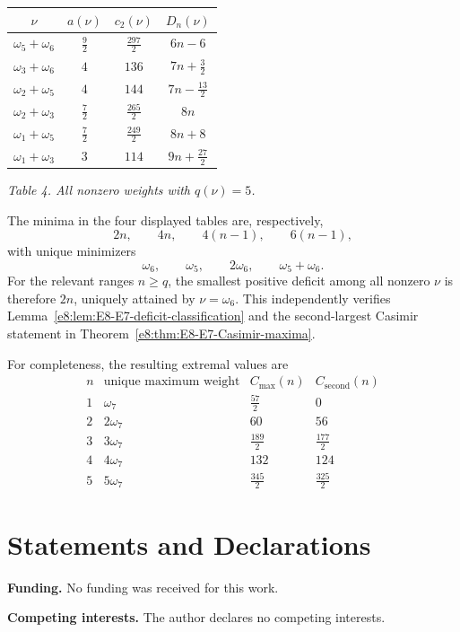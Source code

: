 \documentclass[11pt,reqno]{amsart}
\renewcommand{\arraystretch}{1.32}
\theoremstyle{definition}
\theoremstyle{remark}
\begin{document}
\begin{center}
\renewcommand{\arraystretch}{1.18}
\begin{tabular}{c|c|c|c}
$\nu$ & $a(\nu)$ & $c_2(\nu)$ & $D_n(\nu)$\\
\hline
$\omega_5+\omega_6$ & $\frac92$ & $\frac{297}{2}$
  & $6n-6$\\
$\omega_3+\omega_6$ & $4$ & $136$ & $7n+\frac32$\\
$\omega_2+\omega_5$ & $4$ & $144$ & $7n-\frac{13}{2}$\\
$\omega_2+\omega_3$ & $\frac72$ & $\frac{265}{2}$
  & $8n$\\
$\omega_1+\omega_5$ & $\frac72$ & $\frac{249}{2}$
  & $8n+8$\\
$\omega_1+\omega_3$ & $3$ & $114$ & $9n+\frac{27}{2}$
\end{tabular}
\par\smallskip
\textit{Table 4. All nonzero weights with $q(\nu)=5$.}
\end{center}

The minima in the four displayed tables are, respectively,
\begin{equation*}
 2n,\qquad 4n,\qquad 4(n-1),\qquad 6(n-1),
\end{equation*}
with unique minimizers
\begin{equation*}
 \omega_6,
 \qquad
 \omega_5,
 \qquad
 2\omega_6,
 \qquad
 \omega_5+\omega_6.
\end{equation*}
For the relevant ranges $n\ge q$, the smallest positive deficit among all
nonzero $\nu$ is therefore $2n$, uniquely attained by $\nu=\omega_6$.
This independently verifies Lemma~\ref{e8:lem:E8-E7-deficit-classification}
and the second-largest Casimir statement in
Theorem~\ref{e8:thm:E8-E7-Casimir-maxima}.

For completeness, the resulting extremal values are
\begin{equation*}
\begin{array}{c|c|c|c}
 n & \text{unique maximum weight} & C_{\max}(n) & C_{\mathrm{second}}(n)\\
\hline
 1&\omega_7&\frac{57}{2}&0\\
 2&2\omega_7&60&56\\
 3&3\omega_7&\frac{189}{2}&\frac{177}{2}\\
 4&4\omega_7&132&124\\
 5&5\omega_7&\frac{345}{2}&\frac{325}{2}
\end{array}
\end{equation*}
\section*{Statements and Declarations}
\noindent\textbf{Funding.} No funding was received for this work.

\smallskip
\noindent\textbf{Competing interests.} The author declares no competing interests.

\printbibliography[title={References}]
\end{document}

